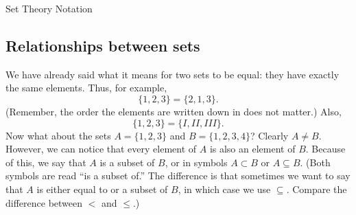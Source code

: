 \documentclass[12pt]{article}
\begin{document}
\begin{defbox}{Set Theory Notation}
\end{defbox}





\subsection{Relationships between sets}

We have already said what it means for two sets to be equal: they have exactly the same elements.  Thus, for example,
\[ \{1, 2, 3\} = \{2, 1, 3\}.\]
(Remember, the order the elements are written down in does not matter.)  Also,
\[ \{1, 2, 3\} = \{I, II, III\}.\]
Now what about the sets $A = \{1, 2, 3\}$ and $B = \{1, 2, 3, 4\}$?  Clearly $A \ne B$.  However, we can notice that every element of $A$ is also an element of $B$.  Because of this, we say that $A$ is a subset of $B$, or in symbols $A \subset B$ or $A \subseteq B$.  (Both symbols are read ``is a subset of.'' The difference is that sometimes we want to say that $A$ is either equal to or a subset of $B$, in which case we use $\subseteq$.  Compare the difference between $<$ and $\le$.)
\end{document}
